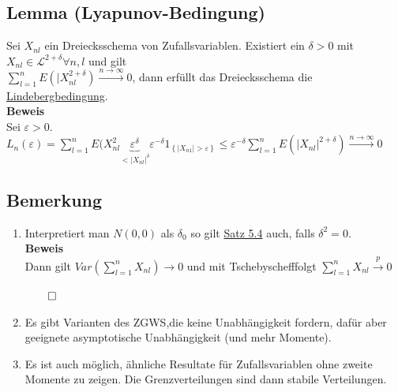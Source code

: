 \documentclass[german,10pt,oneside, fleqn, a4paper]{article}
\newcommand{\tscheb}{Tschebyscheff}
\newcommand{\ra}{\rightarrow}
\newcommand{\sm}[2][\infty]{\sum\limits_{#2}^{#1}}
\newcommand{\brc}[1]{\left(#1\right)}
\newcommand{\brac}[1]{\left\lbrace #1\right\rbrace}
\newcommand{\QED}{\begin{flushright}$\qed$\end{flushright}}
\newcommand{\mc}[1]{\mathcal{#1}}
\newcommand{\lp}[1]{\mc{L}^{#1}}
\newcommand{\beweis}{\textbf{Beweis}\\}
\newcommand{\toinf}{\rightarrow\infty}
\newcommand{\1}[1]{1_{#1}}
\newcommand{\2}[1]{\1{\brac{#1}}}
\newcommand{\xr}[2][]{\xrightarrow[#1]{#2}}
\begin{document}
\subsection{Lemma (Lyapunov-Bedingung)}
\label{5.7}
Sei $X_{nl}$ ein Dreiecksschema von Zufallsvariablen. Existiert ein $\delta>0$ mit $X_{nl}\in\lp{2+\delta}\forall n,l$ und gilt\\
$\sm[n]{l=1}E\brc{|X_{nl}^{2+\delta}}\xr{n\toinf}0$, dann erfüllt das Dreiecksschema die \hyperref[5.4]{Lindebergbedingung}.\\
\beweis
Sei $\varepsilon>0$.\\
$L_n(\varepsilon)=\sm[n]{l=1}E(X_{nl}^2\underbrace{\varepsilon^\delta}_{<|X_{nl}|^\delta}\varepsilon^{-\delta}\1{\brac{|X_{n1}|>\varepsilon}}\leq\varepsilon^{-\delta}\sm[n]{l=1}E\brc{|X_{nl}|^{2+\delta}}\xr{n\toinf}0$

\subsection{Bemerkung}
\label{5.8}
\begin{enumerate}[label=(\alph*)]
\item Interpretiert man $N(0,0)$ als $\delta_0$ so gilt \hyperref[5.4]{Satz 5.4} auch, falls $\delta^2=0$.\\
\beweis
Dann gilt $Var\brc{\sm[n]{l=1}X_{nl}}\ra 0$ und mit \tscheb folgt $\sm[n]{l=1}X_{nl}\xr{p}0$\QED
\item Es gibt Varianten des ZGWS,die keine Unabhängigkeit fordern, dafür aber geeignete asymptotische Unabhängigkeit (und mehr Momente).
\item Es ist auch möglich, ähnliche Resultate für Zufallsvariablen ohne zweite Momente zu zeigen. Die Grenzverteilungen sind dann stabile Verteilungen.
\end{enumerate}
\end{document}
